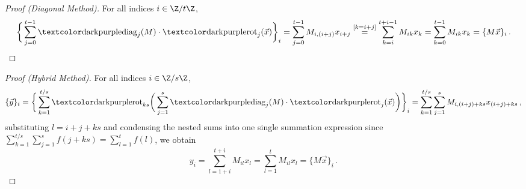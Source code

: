\begin{frame}[c]
  \begin{proof}[Proof (Diagonal Method)]
    For all indices $i \in \Z/t\Z$,
    $$\bigg\{\sum_{j=0}^{t-1} \diag_j(M) \cdot \rot_j(\vec{x})\bigg\}_i
      = \sum_{j=0}^{t-1} M_{i,(i+j)} x_{i+j}
      \overset{[k=i+j]}{=} \sum_{k=i}^{t+i-1} M_{ik} x_k
      = \sum_{k=0}^{t-1} M_{ik} x_k
      = \{M \vec{x}\}_i \,.$$
  \end{proof}
\end{frame}

\begin{frame}[c]
  \begin{proof}[Proof (Hybrid Method)]
    For all indices $i \in \Z/s\Z$,
    $$\{\vec{y}\}_i = \bigg\{\sum_{k=1}^{t / s} \rot_{ks}\bigg(\sum_{j=1}^s \diag_j(M) \cdot \rot_j(\vec{x})\bigg)\bigg\}_i = \sum_{k=1}^{t / s} \sum_{j=1}^{s} M_{i,(i+j) + ks} x_{(i+j) + ks} \,,$$
    substituting $l = i+j+ks$ and condensing the nested sums into one single summation expression since $\sum_{k=1}^{t / s} \sum_{j=1}^{s} f(j+ks) = \sum_{l=1}^{t} f(l)$, we obtain
    $$y_i = \sum_{l=1+i}^{t+i} M_{il} x_l = \sum_{l=1}^{t} M_{il} x_l = \{M \vec{x}\}_i \,.$$
  \end{proof}
\end{frame}

